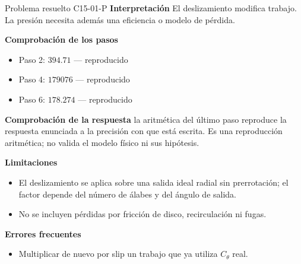 \documentclass[10pt,openany]{book}
\begin{document}
\begin{studiumworked}{Problema resuelto C15-01-P}
\noindent\textbf{Interpretación}
El deslizamiento modifica trabajo. La presión necesita además una eficiencia o modelo de pérdida.

\noindent\textbf{Comprobación de los pasos}
\begin{itemize}
\item Paso 2: $394.71$ — reproducido
\item Paso 4: $179076$ — reproducido
\item Paso 6: $178.274$ — reproducido
\end{itemize}

\noindent\textbf{Comprobación de la respuesta} la aritmética del último paso reproduce la respuesta enunciada a la precisión con que está escrita. Es una reproducción aritmética; no valida el modelo físico ni sus hipótesis.

\noindent\textbf{Limitaciones}
\begin{itemize}
\item El deslizamiento se aplica sobre una salida ideal radial sin prerrotación; el factor depende del número de álabes y del ángulo de salida.
\item No se incluyen pérdidas por fricción de disco, recirculación ni fugas.
\end{itemize}

\noindent\textbf{Errores frecuentes}
\begin{itemize}
\item Multiplicar de nuevo por slip un trabajo que ya utiliza $C_\theta$ real.
\end{itemize}
\end{studiumworked}
\end{document}
